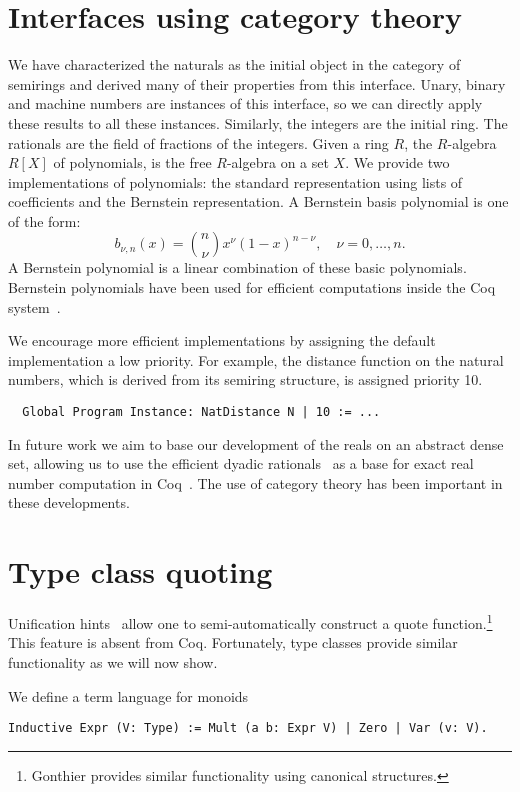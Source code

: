 \documentclass[a4paper,10pt,runningheads]{llncs}
\begin{document}
\section{Interfaces using category theory}\label{interfaces}\label{modul}
We have characterized the naturals as the initial object in the category of semirings and derived
many of their properties from this interface. Unary, binary and machine numbers are
instances of this interface, so we can directly apply these results to all these instances.
Similarly, the integers are the initial ring. The rationals are the field of fractions of the
integers. 
Given a ring $R$, the $R$-algebra $R[X]$ of polynomials, is the free $R$-algebra on a set $X$.
We provide two implementations of polynomials: the
standard representation using lists of coefficients and the Bernstein representation. A Bernstein
basis polynomial is one of the form:
\[b_{\nu,n}(x) = {n \choose \nu} x^{\nu} \left( 1 - x \right)^{n - \nu}, \quad \nu = 0, \ldots, n.\]
A Bernstein polynomial is a linear combination of these basic polynomials. Bernstein polynomials
have been used for efficient computations inside the Coq system~\cite{ZumkellerPhD}.

We encourage more efficient implementations by assigning the default implementation a
low priority. For example, the distance function on the natural numbers, which is derived from its
semiring structure, is assigned priority 10.
\begin{lstlisting}
  Global Program Instance: NatDistance N | 10 := ...
\end{lstlisting}

In future work we aim to base our development of the reals
on an abstract dense set, allowing us to use the efficient dyadic
rationals~\cite{boldo2009combining} as a base for exact real number computation in
Coq~\cite{Riemann,Oconnor:real}. The use of category theory has been important in these developments.

\section{Type class quoting}\label{quote}
Unification hints~\cite{Hints} allow one to semi-automatically construct a quote
function.\footnote{Gonthier provides similar functionality using canonical structures.} This feature is absent from Coq. Fortunately, type classes provide similar functionality as we will now show.

We define a term language for monoids
\begin{lstlisting}
Inductive Expr (V: Type) := Mult (a b: Expr V) | Zero | Var (v: V).
\end{lstlisting}
\end{document}
